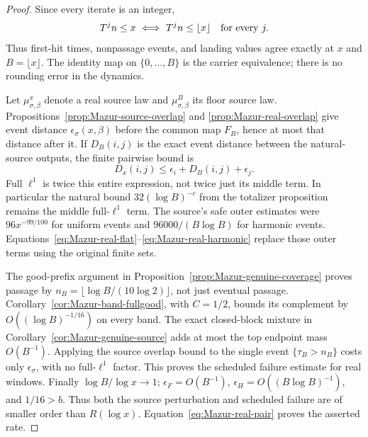 \begin{proof}
Since every iterate is an integer,
\[
 T^j n\le x\ \Longleftrightarrow\ T^j n\le\lfloor x\rfloor
 \quad\hbox{for every }j.
\]
Thus first-hit times, nonpassage events, and landing values agree
exactly at \(x\) and \(B=\lfloor x\rfloor\).
The identity map on \(\{0,\ldots,B\}\) is the carrier equivalence;
there is no rounding error in the dynamics.

Let \(\mu_{\sigma,\beta}^{x}\) denote a real source law and
\(\mu_{\sigma,\beta}^{B}\) its floor source law.
Propositions~\ref{prop:Mazur-source-overlap} and
\ref{prop:Mazur-real-overlap} give event distance
\(\epsilon_\sigma(x,\beta)\) before the common map \(F_B\), hence
at most that distance after it. If \(D_B(i,j)\) is the exact
event distance between the natural-source outputs, the finite
pairwise bound is
\begin{equation}
 D_x(i,j)\le\epsilon_i+D_B(i,j)+\epsilon_j.
 \label{eq:Mazur-real-pair}
\end{equation}
Full \(\ell^1\) is twice this entire expression, not twice just its
middle term. In particular the natural bound \(32(\log B)^{-c}\)
from the totalizer proposition remains the middle full-\(\ell^1\)
term. The source's safe outer estimates were \(96x^{-99/100}\)
for uniform events and \(96000/(B\log B)\) for harmonic events.
Equations~\eqref{eq:Mazur-real-flat}--\eqref{eq:Mazur-real-harmonic}
replace those outer terms using the original finite sets.

The good-prefix argument in
Proposition~\ref{prop:Mazur-genuine-coverage} proves passage by
\(n_B=\lfloor\log B/(10\log2)\rfloor\), not just eventual passage.
Corollary~\ref{cor:Mazur-band-fullgood}, with \(C=1/2\), bounds
its complement by \(O((\log B)^{-1/16})\) on every band.
The exact closed-block mixture in
Corollary~\ref{cor:Mazur-genuine-source} adds at most the top
endpoint mass \(O(B^{-1})\). Applying the source overlap bound
to the single event \(\{\tau_B>n_B\}\) costs only
\(\epsilon_\sigma\), with no full-\(\ell^1\) factor.
This proves the scheduled failure estimate for real windows.
Finally \(\log B/\log x\to1\);
\(\epsilon_F=O(B^{-1})\), \(\epsilon_H=O((B\log B)^{-1})\),
and \(1/16>b\). Thus both the source perturbation and scheduled
failure are of smaller order than \(R(\log x)\).
Equation~\eqref{eq:Mazur-real-pair} proves the asserted rate.
\end{proof}

